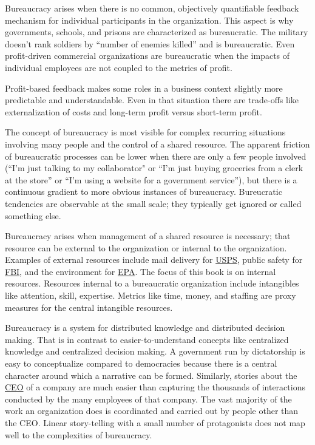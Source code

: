 Bureaucracy arises when there is no common, objectively quantifiable feedback mechanism for individual participants in the organization. This aspect is why governments, schools, and prisons are characterized as bureaucratic. The military doesn't rank soldiers by ``number of enemies killed'' and is bureaucratic. Even profit-driven commercial organizations are bureaucratic when the impacts of individual employees are not coupled to the metrics of profit. 

Profit-based feedback makes some roles in a business context slightly more predictable and understandable. Even in that situation there are trade-offs like externalization of costs and long-term profit versus short-term profit. 

The concept of bureaucracy is most visible for complex recurring situations involving many people and the control of a shared resource. The apparent friction of bureaucratic processes can be lower when there are only a few people involved (``I'm just talking to my collaborator" or ``I'm just buying groceries from a clerk at the store'' or ``I'm using a website for a government service''), but there is a continuous gradient to more obvious instances of bureaucracy. Bureucratic tendencies are observable at the small scale; they typically get ignored or called something else.

Bureaucracy arises when management of a shared resource is necessary; that resource can be external to the organization or internal to the organization. Examples of external resources include mail delivery for \href{https://en.wikipedia.org/wiki/United_States_Postal_Service}{USPS}, public safety for \href{https://en.wikipedia.org/wiki/Federal_Bureau_of_Investigation}{FBI}, and the environment for \href{https://en.wikipedia.org/wiki/United_States_Environmental_Protection_Agency}{EPA}. The focus of this book is on internal resources. Resources internal to a bureaucratic organization include intangibles like attention, skill, expertise. Metrics like time, money, and staffing are proxy measures for the central intangible resources.



Bureaucracy is a system for distributed knowledge and distributed decision making. That is in contrast to easier-to-understand concepts like centralized knowledge and centralized decision making. A government run by dictatorship is easy to conceptualize compared to democracies because there is a central character around which a narrative can be formed. Similarly, stories about the \href{https://en.wikipedia.org/wiki/Chief_executive_officer}{CEO} of a company are much easier than capturing the thousands of interactions conducted by the many employees of that company. The vast majority of the work an organization does is coordinated and carried out by people other than the CEO. Linear story-telling with a small number of protagonists does not map well to the complexities of bureaucracy. 



